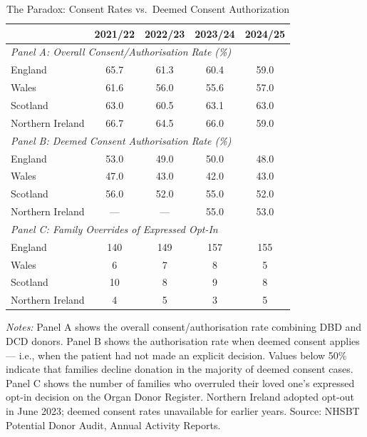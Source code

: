 \begin{table}[htbp]
\centering
\caption{The Paradox: Consent Rates vs.\ Deemed Consent Authorization}
\label{tab:paradox}
\begin{threeparttable}
\begin{tabular}{lcccc}
\toprule
 & 2021/22 & 2022/23 & 2023/24 & 2024/25 \\
\midrule
\multicolumn{5}{l}{\textit{Panel A: Overall Consent/Authorisation Rate (\%)}} \\
\quad England & 65.7 & 61.3 & 60.4 & 59.0 \\
\quad Wales & 61.6 & 56.0 & 55.6 & 57.0 \\
\quad Scotland & 63.0 & 60.5 & 63.1 & 63.0 \\
\quad Northern Ireland & 66.7 & 64.5 & 66.0 & 59.0 \\
\midrule
\multicolumn{5}{l}{\textit{Panel B: Deemed Consent Authorisation Rate (\%)}} \\
\quad England & 53.0 & 49.0 & 50.0 & 48.0 \\
\quad Wales & 47.0 & 43.0 & 42.0 & 43.0 \\
\quad Scotland & 56.0 & 52.0 & 55.0 & 52.0 \\
\quad Northern Ireland & --- & --- & 55.0 & 53.0 \\
\midrule
\multicolumn{5}{l}{\textit{Panel C: Family Overrides of Expressed Opt-In}} \\
\quad England & 140 & 149 & 157 & 155 \\
\quad Wales & 6 & 7 & 8 & 5 \\
\quad Scotland & 10 & 8 & 9 & 8 \\
\quad Northern Ireland & 4 & 5 & 3 & 5 \\
\bottomrule
\end{tabular}
\begin{tablenotes}[flushleft]\footnotesize
\item \textit{Notes:} Panel A shows the overall consent/authorisation rate combining DBD and DCD donors. Panel B shows the authorisation rate when deemed consent applies --- i.e., when the patient had not made an explicit decision. Values below 50\% indicate that families decline donation in the majority of deemed consent cases. Panel C shows the number of families who overruled their loved one's expressed opt-in decision on the Organ Donor Register. Northern Ireland adopted opt-out in June 2023; deemed consent rates unavailable for earlier years. Source: NHSBT Potential Donor Audit, Annual Activity Reports.
\end{tablenotes}
\end{threeparttable}
\end{table}
